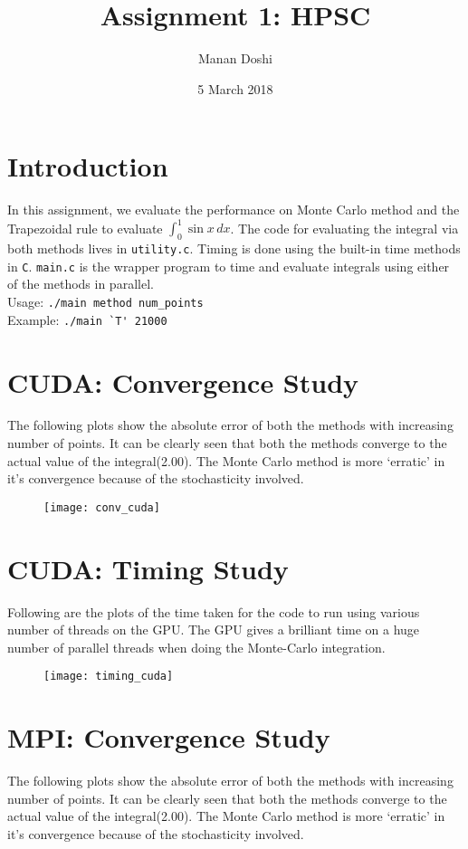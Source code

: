 \documentclass{article}
\title{Assignment 1: HPSC}
\author{Manan Doshi}
\date{5 March 2018}
\begin{document}
\graphicspath{{/}}
\maketitle

\section{Introduction}
In this assignment, we evaluate the performance on Monte Carlo method and the Trapezoidal rule to evaluate \(\int_{0}^{1} \sin x \, dx \). The code for evaluating the integral via both methods lives in \texttt{utility.c}. Timing is done using the built-in time methods in \texttt{C}. \texttt{main.c} is the wrapper program to time and evaluate integrals using either of the methods in parallel.\\

Usage: \verb|./main method num_points|\\
Example: \verb|./main `T' 21000|\\


\section{CUDA: Convergence Study}
The following plots show the absolute error of both the methods with increasing number of points. It can be clearly seen that both the methods converge to the actual value of the integral(2.00). The Monte Carlo method is more `erratic' in it's convergence because of the stochasticity involved.

\begin{figure}[h!]
\centering
\texttt{[image: conv\_cuda]}
\end{figure}

\newpage
\section{CUDA: Timing Study}

Following are the plots of the time taken for the code to run using various number of threads on the GPU. The GPU gives a brilliant time on a huge number of parallel threads when doing the Monte-Carlo integration.

\begin{figure}[h!]
\centering
\texttt{[image: timing\_cuda]}
\end{figure}

\newpage
\section{MPI: Convergence Study}
The following plots show the absolute error of both the methods with increasing number of points. It can be clearly seen that both the methods converge to the actual value of the integral(2.00). The Monte Carlo method is more `erratic' in it's convergence because of the stochasticity involved.
\end{document}
